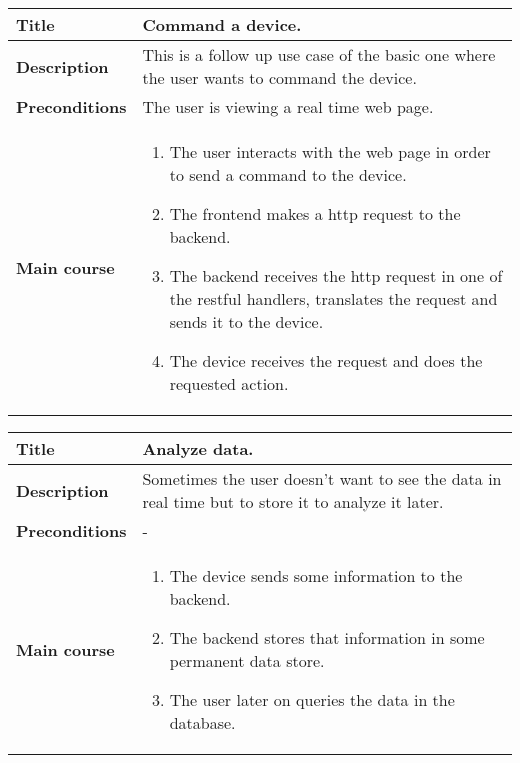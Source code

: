 \documentclass[12pt]{article}
\begin{document}
            \begin{tabularx}{\textwidth}{|l|X|}
                \hline
                \textbf{Title} & Command a device.\\
                \hline
                \textbf{Description} & This is a follow up use case of the basic
                one where the user wants to command the device.\\
                \hline
                \textbf{Preconditions} & The user is viewing a real time web
                page.\\
                \hline
                \textbf{Main course} &
                    \begin{enumerate}
                        \item The user interacts with the web page in order to
                              send a command to the device.
                        \item The frontend makes a http request to the backend.
                        \item The backend receives the http request in one of
                              the restful handlers, translates the request and
                              sends it to the device.
                        \item The device receives the request and does the
                              requested action.
                    \end{enumerate}\\
                \hline
            \end{tabularx}

            \begin{tabularx}{\textwidth}{|l|X|}
                \hline
                \textbf{Title} & Analyze data.\\
                \hline
                \textbf{Description} & Sometimes the user doesn't want to see
                the data in real time but to store it to analyze it later.\\
                \hline
                \textbf{Preconditions} & - \\
                \hline
                \textbf{Main course} &
                    \begin{enumerate}
                        \item The device sends some information to the backend.
                        \item The backend stores that information in some
                              permanent data store.
                        \item The user later on queries the data in the
                              database.
                    \end{enumerate}\\
                \hline
            \end{tabularx}
\end{document}
